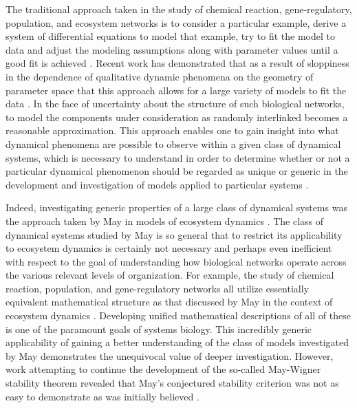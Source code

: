 The traditional approach taken in the study of chemical reaction, gene-regulatory, population, and ecosystem networks is to consider a particular example, derive a system of differential equations to model that example, try to fit the model to data and adjust the modeling assumptions along with parameter values until a good fit is achieved \cite{Meyer2014}. Recent work has demonstrated that as a result of sloppiness in the dependence of qualitative dynamic phenomena on the geometry of parameter space that this approach allows for a large variety of models to fit the data \cite{Brown2003,Gutenkunst2007,Daniels2008a,Machta2013,Hines2014,Prabakaran2014,Tonsing2014}. In the face of uncertainty about the structure of such biological networks, to model the components under consideration as randomly interlinked becomes a reasonable approximation. This approach enables one to gain insight into what dynamical phenomena are possible to observe within a given class of dynamical systems, which is necessary to understand in order to determine whether or not a particular dynamical phenomenon should be regarded as unique or generic in the development and investigation of models applied to particular systems \cite{Gunawardena2013,Gunawardena2014}.

Indeed, investigating generic properties of a large class of dynamical systems was the approach taken by May in models of ecosystem dynamics \cite{Gardner1970,May1972}. The class of dynamical systems studied by May is so general that to restrict its applicability to ecosystem dynamics is certainly not necessary and perhaps even inefficient with respect to the goal of understanding how biological networks operate across the various relevant levels of organization. For example, the study of chemical reaction, population, and gene-regulatory networks all utilize essentially equivalent mathematical structure as that discussed by May in the context of ecosystem dynamics \cite{RossCr2003,Alon2006,Palsson2006,HamidBolouri2008,Palsson2011a,Voit2012,Sauro2012}. Developing unified mathematical descriptions of all of these is one of the paramount goals of systems biology. This incredibly generic applicability of gaining a better understanding of the class of models investigated by May demonstrates the unequivocal value of deeper investigation.  However, work attempting to continue the development of the so-called May-Wigner stability theorem revealed that May's conjectured stability criterion was not as easy to demonstrate as was initially believed \cite{Cohen1984,May1972a,Radius2014}.

